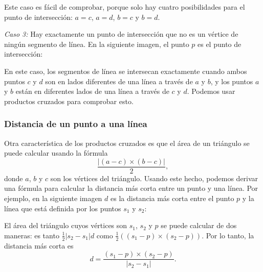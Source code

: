 Este caso es fácil de comprobar, porque
solo hay cuatro posibilidades
para el punto de intersección:
$a=c$, $a=d$, $b=c$ y $b=d$.

\textit{Caso 3:}
Hay exactamente un punto de intersección
que no es un vértice de ningún segmento de línea.
En la siguiente imagen, el punto $p$
es el punto de intersección:
\begin{center}
\end{center}

En este caso, los segmentos de línea se intersecan
exactamente cuando ambos puntos $c$ y $d$ son
en lados diferentes de una línea a través de $a$ y $b$,
y los puntos $a$ y $b$ están en diferentes
lados de una línea a través de $c$ y $d$.
Podemos usar productos cruzados para comprobar esto.

\subsubsection{Distancia de un punto a una línea}

Otra característica de los productos cruzados es que
el área de un triángulo se puede calcular
usando la fórmula
\[\frac{| (a-c) \times (b-c) |}{2},\]
donde $a$, $b$ y $c$ son los vértices del triángulo.
Usando este hecho, podemos derivar una fórmula
para calcular la distancia más corta entre un punto y una línea.
Por ejemplo, en la siguiente imagen $d$ es la
distancia más corta entre el punto $p$ y la línea
que está definida por los puntos $s_1$ y $s_2$:
\begin{center}
\end{center}

El área del triángulo cuyos vértices son
$s_1$, $s_2$ y $p$ se puede calcular de dos maneras:
es tanto
$\frac{1}{2} |s_2-s_1| d$ como
$\frac{1}{2} ((s_1-p) \times (s_2-p))$.
Por lo tanto, la distancia más corta es
\[ d = \frac{(s_1-p) \times (s_2-p)}{|s_2-s_1|} .\]

